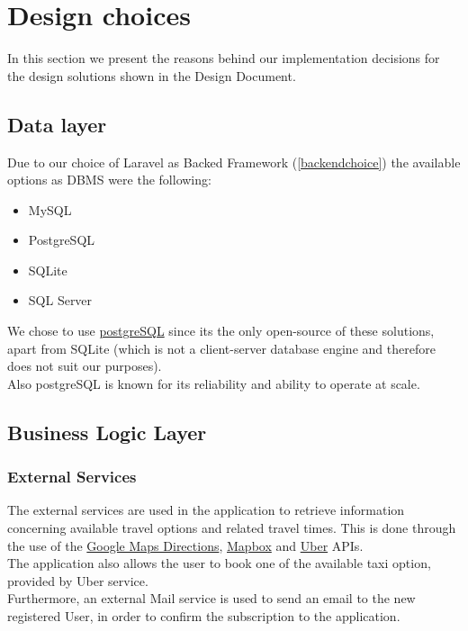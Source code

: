 \section{Design choices }

In this section we present the reasons behind our implementation decisions for the design solutions shown in the Design Document.

\subsection{Data layer}


Due to our choice of Laravel as Backed Framework (\ref{backendchoice})  the available options as DBMS were the following:
\begin{itemize}
	\item MySQL
	\item PostgreSQL
	\item SQLite
	\item SQL Server
\end{itemize}
We chose to use \href{https://www.postgresql.org/}{postgreSQL} since its the only open-source of these solutions, apart from SQLite (which is not a client-server database engine and therefore does not suit our purposes).\\
Also postgreSQL is known for its reliability and ability to operate at scale.

\subsection{Business Logic Layer}

\subsubsection{External Services}
\label{exservices}
The external services are used in the application to retrieve information concerning available travel options and related travel times. This is done through the use of the \href{https://https://developers.google.com/}{Google Maps Directions}, \href{https://www.mapbox.com}{Mapbox} and \href{https://developer.uber.com/}{Uber} APIs.\\
The application also allows the user to book one of the available taxi option, provided by Uber service.\\
Furthermore, an external Mail service is used to send an email to the new registered User, in order to confirm the subscription to the application.

